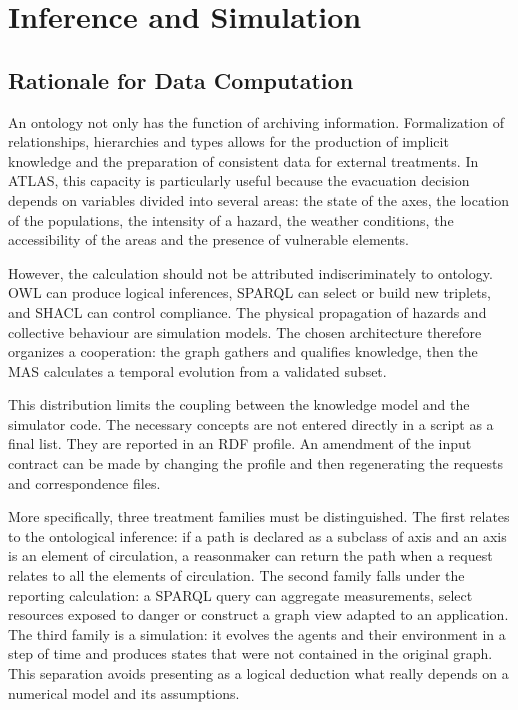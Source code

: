 \documentclass{article}
\begin{document}
\clearpage
\section{Inference and Simulation}
\subsection{Rationale for Data Computation}

An ontology not only has the function of archiving information. Formalization of relationships, hierarchies and types allows for the production of implicit knowledge and the preparation of consistent data for external treatments. In ATLAS, this capacity is particularly useful because the evacuation decision depends on variables divided into several areas: the state of the axes, the location of the populations, the intensity of a hazard, the weather conditions, the accessibility of the areas and the presence of vulnerable elements.

However, the calculation should not be attributed indiscriminately to ontology. OWL can produce logical inferences, SPARQL can select or build new triplets, and SHACL can control compliance. The physical propagation of hazards and collective behaviour are simulation models. The chosen architecture therefore organizes a cooperation: the graph gathers and qualifies knowledge, then the MAS calculates a temporal evolution from a validated subset.

This distribution limits the coupling between the knowledge model and the simulator code. The necessary concepts are not entered directly in a script as a final list. They are reported in an RDF profile. An amendment of the input contract can be made by changing the profile and then regenerating the requests and correspondence files.

More specifically, three treatment families must be distinguished. The first relates to the ontological inference: if a path is declared as a subclass of axis and an axis is an element of circulation, a reasonmaker can return the path when a request relates to all the elements of circulation. The second family falls under the reporting calculation: a SPARQL query can aggregate measurements, select resources exposed to danger or construct a graph view adapted to an application. The third family is a simulation: it evolves the agents and their environment in a step of time and produces states that were not contained in the original graph. This separation avoids presenting as a logical deduction what really depends on a numerical model and its assumptions.
\end{document}
